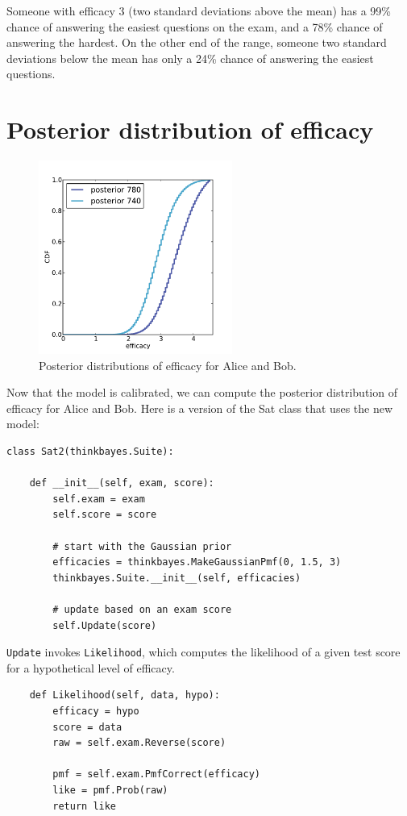 \documentclass[12pt]{book}
\begin{document}
Someone with efficacy 3 (two standard deviations above
the mean) has a 99\% chance of answering the easiest questions on
the exam, and a 78\% chance of answering the hardest.  On the other
end of the range, someone two standard deviations below the mean
has only a 24\% chance of answering the easiest questions.


\section{Posterior distribution of efficacy}

\begin{figure}
\centerline{\includegraphics[height=2.5in]{figs/sat_posteriors_eff.pdf}}
\caption{Posterior distributions of efficacy for Alice and Bob.}
\label{fig.satposterior2}
\end{figure}

Now that the model is calibrated, we can compute the posterior
distribution of efficacy for Alice and Bob.  Here is a version of the
Sat class that uses the new model:

\begin{verbatim}
class Sat2(thinkbayes.Suite):

    def __init__(self, exam, score):
        self.exam = exam
        self.score = score

        # start with the Gaussian prior
        efficacies = thinkbayes.MakeGaussianPmf(0, 1.5, 3)
        thinkbayes.Suite.__init__(self, efficacies)

        # update based on an exam score
        self.Update(score)
\end{verbatim}

\verb"Update" invokes
\verb"Likelihood", which computes the likelihood of a given test score
for a hypothetical level of efficacy.

\begin{verbatim}
    def Likelihood(self, data, hypo):
        efficacy = hypo
        score = data
        raw = self.exam.Reverse(score)

        pmf = self.exam.PmfCorrect(efficacy)
        like = pmf.Prob(raw)
        return like
\end{verbatim}
\end{document}
